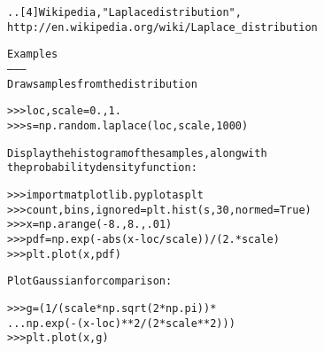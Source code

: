\begin{boxedminipage}{\funcwidth}
\begin{alltt}
.. [4] Wikipedia, "Laplace distribution",
       http://en.wikipedia.org/wiki/Laplace\_distribution

Examples
--------
Draw samples from the distribution

{\textgreater}{\textgreater}{\textgreater} loc, scale = 0., 1.
{\textgreater}{\textgreater}{\textgreater} s = np.random.laplace(loc, scale, 1000)

Display the histogram of the samples, along with
the probability density function:

{\textgreater}{\textgreater}{\textgreater} import matplotlib.pyplot as plt
{\textgreater}{\textgreater}{\textgreater} count, bins, ignored = plt.hist(s, 30, normed=True)
{\textgreater}{\textgreater}{\textgreater} x = np.arange(-8., 8., .01)
{\textgreater}{\textgreater}{\textgreater} pdf = np.exp(-abs(x-loc/scale))/(2.*scale)
{\textgreater}{\textgreater}{\textgreater} plt.plot(x, pdf)

Plot Gaussian for comparison:

{\textgreater}{\textgreater}{\textgreater} g = (1/(scale * np.sqrt(2 * np.pi)) * 
...      np.exp( - (x - loc)**2 / (2 * scale**2) ))
{\textgreater}{\textgreater}{\textgreater} plt.plot(x,g)
\end{alltt}

\setlength{\parskip}{1ex}
    \end{boxedminipage}

    \label{QSTK:qstklearn:mldiagnostics:logistic}

    \vspace{0.5ex}

